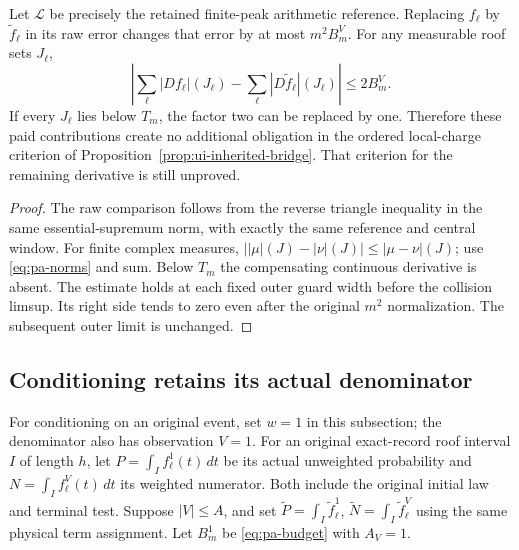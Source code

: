 \begin{corollary}
\label{cor:pa-interfaces}
Let $\mathcal L$ be precisely the retained finite-peak arithmetic
reference. Replacing $f_\ell$ by $\widetilde f_\ell$ in its raw
error changes that error by at most $m^2B_m^V$. For any measurable
roof sets $J_\ell$,
\begin{equation}\label{eq:pa-local-variation}
 \left|\sum_\ell |Df_\ell|(J_\ell)
              -\sum_\ell|D\widetilde f_\ell|(J_\ell)\right|
                         \le2B_m^V.
\end{equation}
If every $J_\ell$ lies below $T_m$, the factor two can be replaced
by one. Therefore these paid contributions create no additional
obligation in the ordered local-charge criterion of
Proposition~\ref{prop:ui-inherited-bridge}. That criterion for
the remaining derivative is still unproved.
\end{corollary}
\begin{proof}
The raw comparison follows from the reverse triangle inequality
in the same essential-supremum norm, with exactly the same
reference and central window. For finite complex measures,
$||\mu|(J)-|\nu|(J)|\le|\mu-\nu|(J)$; use
\eqref{eq:pa-norms} and sum. Below $T_m$ the compensating
continuous derivative is absent. The estimate holds at each
fixed outer guard width before the collision limsup.
Its right side tends to zero even after the original $m^2$
normalization. The subsequent outer limit is unchanged.
\end{proof}

\subsection{Conditioning retains its actual denominator}

For conditioning on an original event, set $w=1$ in this subsection;
the denominator also has observation $V=1$. For an original
exact-record roof interval $I$ of length $h$,
let $P=\int_I f^1_\ell(t)\,dt$ be its actual unweighted
probability and $N=\int_I f^V_\ell(t)\,dt$ its weighted
numerator. Both include the original initial law and terminal
test. Suppose $|V|\le A$, and set
$\widetilde P=\int_I\widetilde f^1_\ell$,
$\widetilde N=\int_I\widetilde f^V_\ell$ using the same
physical term assignment. Let $B_m^1$ be \eqref{eq:pa-budget}
with $A_V=1$.


